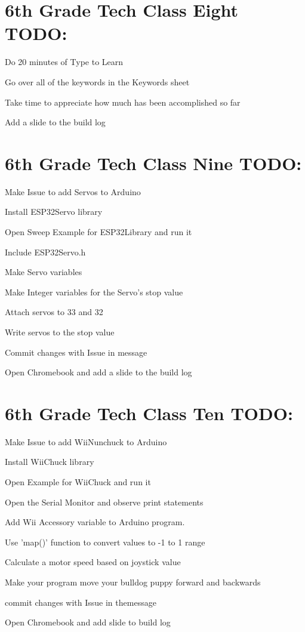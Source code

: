 \documentclass{article}
\begin{document}
\section{6th Grade Tech Class Eight TODO:}
\begin{todolist}
	\item Do 20 minutes of Type to Learn
	\item Go over all of the keywords in the Keywords sheet
	\item Take time to appreciate how much has been accomplished so far
	\item Add a slide to the build log
\end{todolist}
\newpage

\section{6th Grade Tech Class Nine TODO:}
\begin{todolist}
	\item Make Issue to add Servos to Arduino
	\item Install ESP32Servo library
	\item Open Sweep Example for ESP32Library and run it
	\item Include ESP32Servo.h
	\item Make Servo variables
	\item Make Integer variables for the Servo's stop value
	\item Attach servos to 33 and 32
	\item Write servos to the stop value
	\item Commit changes with Issue in message
	\item Open Chromebook and add a slide to the build log
\end{todolist}

\section{6th Grade Tech Class Ten TODO:}
\begin{todolist}
	\item Make Issue to add WiiNunchuck to Arduino
	\item Install WiiChuck library
	\item Open Example for WiiChuck and run it
	\item Open the Serial Monitor and observe print statements
	\item Add Wii Accessory variable to Arduino program. 
	\item Use 'map()' function to convert values to -1 to 1 range
	\item Calculate a motor speed based on joystick value
	\item Make your program move your bulldog puppy forward and backwards
	\item commit changes with Issue in themessage
	\item Open Chromebook and add slide to build log
\end{todolist}
\end{document}
